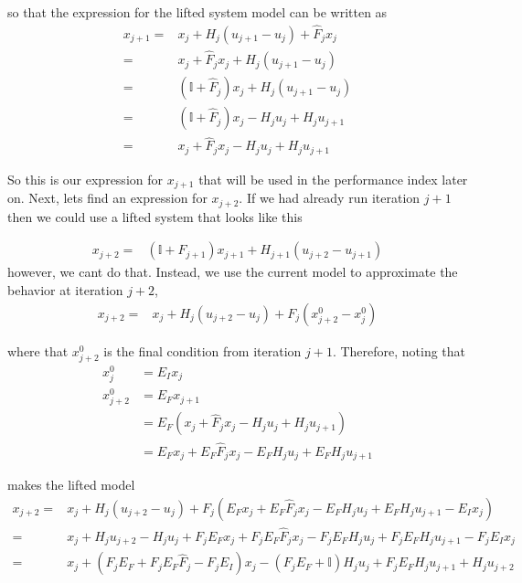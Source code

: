 \documentclass[landscape]{article}
\begin{document}
so that the expression for the lifted system model can be written as
\begin{align}
x_{j+1}  
= & x_j + H_j \left(u_{j+1} - u_j\right) + \hat{F}_j x_j \\
= & x_j + \hat{F}_j x_j + H_j \left(u_{j+1} - u_j\right) \\
= & ( \mathbb{I} + \hat{F}_j ) x_j + H_j \left(u_{j+1} - u_j\right) \\
= & ( \mathbb{I} + \hat{F}_j ) x_j - H_j u_j + H_j u_{j+1} \\
= & x_j + \hat{F}_j x_j - H_j u_j + H_j u_{j+1} 
\end{align}

So this is our expression for $x_{j+1}$ that will be used in the performance index later on.  Next, lets find an expression for $x_{j+2}$.  If we had already run iteration $j+1$ then we could use a lifted system that looks like this

\begin{align}
x_{j+2} = & ( \mathbb{I} + F_{j+1} ) x_{j+1} + H_{j+1} \left(u_{j+2} - u_{j+1}\right) 
\end{align}
however, we cant do that.  Instead, we use the current model to approximate the behavior at iteration $j+2$, 
\begin{align}
x_{j+2} = & x_j + H_j \left(u_{j+2} - u_{j}\right) + F_j\left( x^0_{j+2}-x^0_j\right)
\end{align}

where that $x^0_{j+2}$ is the final condition from iteration $j+1$.  Therefore, noting that 
\begin{align}
x^0_{j}   &= E_I x_j \\
x^0_{j+2} &= E_F x_{j+1} \\
& = E_F \left(x_j + \hat{F}_j x_j - H_j u_j + H_j u_{j+1} \right)\\
& = E_F x_j + E_F \hat{F}_j x_j - E_F H_j u_j + E_F H_j u_{j+1}
\end{align}

makes the lifted model
\begin{align}
x_{j+2} 
= & x_j + H_j \left(u_{j+2} - u_{j}\right) + F_j\left( E_F x_j + E_F \hat{F}_j x_j - E_F H_j u_j + E_F H_j u_{j+1} - E_I x_j\right) \\
= & x_j + H_j u_{j+2} - H_j u_{j} + F_j E_F x_j + F_j E_F \hat{F}_j x_j - F_j E_F H_j u_j + F_j E_F H_j u_{j+1} - F_j E_I x_j \\
= & x_j + \left(F_j E_F + F_j E_F \hat{F}_j - F_j E_I\right)x_j - \left(F_j E_F +\mathbb{I} \right) H_j u_j + F_j E_F H_j u_{j+1}   + H_j u_{j+2}
\end{align}
\end{document}
